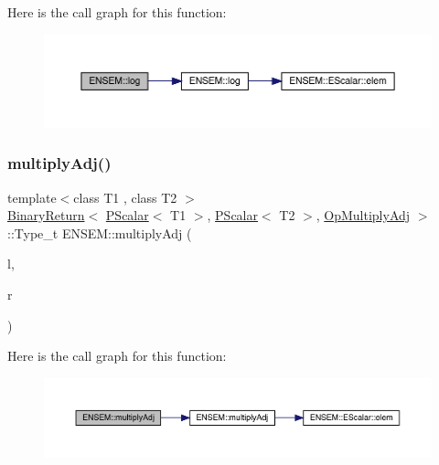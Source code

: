 Here is the call graph for this function\+:\nopagebreak
\begin{figure}[H]
\begin{center}
\leavevmode
\includegraphics[width=350pt]{db/dcc/group__primscalar_ga4793657c8e42b217f973ede3c83b71d7_cgraph}
\end{center}
\end{figure}
\mbox{\label{group__primscalar_gabacc9ee173ff2dff79b3faed5f551bfd}} 
\subsubsection{\texorpdfstring{multiplyAdj()}{multiplyAdj()}}
{\footnotesize\ttfamily template$<$class T1 , class T2 $>$ \\
\mbox{\hyperlink{structENSEM_1_1BinaryReturn}{Binary\+Return}}$<$ \mbox{\hyperlink{classENSEM_1_1PScalar}{P\+Scalar}}$<$ T1 $>$, \mbox{\hyperlink{classENSEM_1_1PScalar}{P\+Scalar}}$<$ T2 $>$, \mbox{\hyperlink{structENSEM_1_1OpMultiplyAdj}{Op\+Multiply\+Adj}} $>$\+::Type\+\_\+t E\+N\+S\+E\+M\+::multiply\+Adj (\begin{DoxyParamCaption}\item[{const \mbox{\hyperlink{classENSEM_1_1PScalar}{P\+Scalar}}$<$ T1 $>$ \&}]{l,  }\item[{const \mbox{\hyperlink{classENSEM_1_1PScalar}{P\+Scalar}}$<$ T2 $>$ \&}]{r }\end{DoxyParamCaption})\hspace{0.3cm}{\ttfamily [inline]}}

Here is the call graph for this function\+:\nopagebreak
\begin{figure}[H]
\begin{center}
\leavevmode
\includegraphics[width=350pt]{db/dcc/group__primscalar_gabacc9ee173ff2dff79b3faed5f551bfd_cgraph}
\end{center}
\end{figure}
\mbox{\label{group__primscalar_gadbbb42ee94a77c2df59c5a4cf78fddeb}} 
